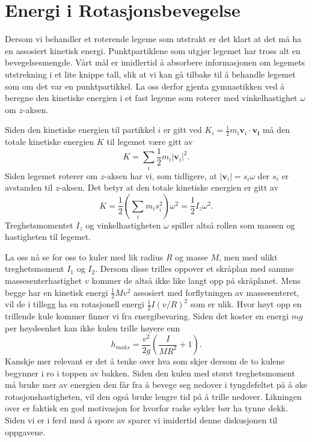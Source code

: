 \documentclass[twoside,utf8]{article}
\begin{document}
\section{Energi i Rotasjonsbevegelse}
Dersom vi behandler et roterende legeme som utstrakt er det klart at det må ha en assosiert kinetisk energi. Punktpartiklene som utgjør legemet har tross alt en bevegelsesmengde. Vårt mål er imidlertid å absorbere informasjonen om legemets utstrekning i et lite knippe tall, slik at vi kan gå tilbake til å behandle legemet som om det var en punktpartikkel. La oss derfor gjenta gymnastikken ved å beregne den kinetiske energien i et fast legeme som roterer med vinkelhastighet $\omega$ om $z$-aksen.

Siden den kinetiske energien til partikkel $i$ er gitt ved $K_i = \frac{1}{2}m_i \mathbf{v}_i\cdot \mathbf{v_i}$ må den totale kinetiske energien $K$ til legemet være gitt av
\[
  K = \sum_i \frac{1}{2}m_i |\mathbf{v}_i|^2.
\]
Siden legemet roterer om $z$-aksen har vi, som tidligere, at $|\mathbf{v}_i| = s_i \omega$ der $s_i$ er avstanden til $z$-aksen. Det betyr at den totale kinetiske energien er gitt av
\[
  K = \frac{1}{2} \left(\sum_i m_i s_i^2  \right)\omega^2 = \frac{1}{2}I_z \omega^2.
\]
Treghetsmomentet $I_z$ og vinkelhastigheten $\omega$ spiller altså rollen som massen og hastigheten til legemet.

La oss nå se for oss to kuler med lik radius $R$ og masse $M$, men med ulikt treghetsmoment $I_1$ og $I_2$. Dersom disse trilles oppover et skråplan med samme massesenterhastighet $v$ kommer de altså ikke like langt opp på skråplanet. Mens begge har en kinetisk energi $\frac{1}{2}Mv^2$ assosiert med forflytningen av massesenteret, vil de i tillegg ha en rotasjonell energi $\frac{1}{2}I(v/R)^2$ som er ulik. Hvor høyt opp en trillende kule kommer finner vi fra energibevaring. Siden det koster en energi $mg$ per høydeenhet kan ikke kulen trille høyere enn
\[
  h_{maks} = \frac{v^2}{2g}\left( \frac{I}{MR^2}+1 \right).
\]
Kanskje mer relevant er det å tenke over hva som skjer dersom de to kulene begynner i ro i toppen av bakken. Siden den kulen med størst treghetsmoment må bruke mer av energien den får fra å bevege seg nedover i tyngdefeltet på å øke rotasjonshastigheten, vil den også bruke lengre tid på å trille nedover. Likningen over er faktisk en god motivasjon for hvorfor raske sykler bør ha tynne dekk. Siden vi er i ferd med å spore av sparer vi imidertid denne diskusjonen til oppgavene.
\end{document}
